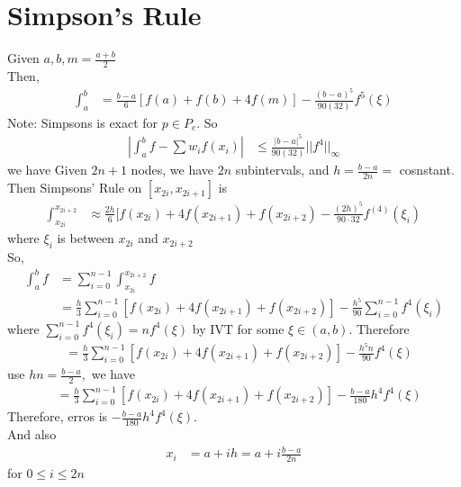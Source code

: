 \documentclass[11pt,oneside]{book}
\theoremstyle{break}
\theoremstyle{break}
\newcommand{\note}{\color{red}Note: \color{black}}
\begin{document}
\section[Simpson's Rule]{Simpson's Rule}
Given $a,b, m=\frac{a+b}{2}$\\
Then, \begin{align*}
\int_{a}^{b}&=\frac{b-a}{6}[f(a)+f(b)+4f(m)]-\frac{(b-a)^5}{90(32)}f^{5}(\xi)
\end{align*}
\note Simpsons is exact for $p\in P_e$. So \begin{align*}
\left|\int_{a}^{b}f-\sum w_if(x_i) \right|&\leq \frac{|b-a|^5}{90(32)}||f^{4}||_{\infty}
\end{align*}
we have Given $2n+1$ nodes, we have $2n$ subintervals, and $h=\frac{b-a}{2n}=$ cosnstant. Then Simpsons' Rule on $[x_{2i},x_{2i+1}]$ is \begin{align*}
\int_{x_{2i}}^{x_{2i+2}}&\approx \frac{2h}{6}[f(x_{2i})+4f(x_{2i+1})+f(x_{2i+2})-\frac{(2h)^5}{90\cdot 32}f^{(4)}(\xi_{i})
\end{align*}
where $\xi_{i}$ is between $x_{2i}$ and $x_{2i+2}$\\
So, \begin{align*}
\int_{a}^{b}f&=\sum_{i=0}^{n-1}\int_{x_{2i}}^{x_{2i+2}}f\\
&=\frac{h}{3}\sum_{i=0}^{n-1}[f(x_{2i})+4f(x_{2i+1})+f(x_{2i+2})]-\frac{h^5}{90}\sum_{i=0}^{n-1}f^{4}(\xi_i)
\end{align*}
where $\sum_{i=0}^{n-1}f^{4}(\xi_i)=nf^{4}(\xi)$ by IVT for some $\xi \in (a,b)$. Therefore \begin{align*}
&=\frac{h}{3}\sum_{i=0}^{n-1}[f(x_{2i})+4f(x_{2i+1})+f(x_{2i+2})]-\frac{h^5n}{90}f^{4}(\xi)
\end{align*}
use $hn=\frac{b-a}{2},$ we have \begin{align*}
&=\frac{h}{3}\sum_{i=0}^{n-1}[f(x_{2i})+4f(x_{2i+1})+f(x_{2i+2})]-\frac{b-a}{180}h^4f^{4}(\xi)
\end{align*}
Therefore, erros is $-\frac{b-a}{180}h^4f^{4}(\xi)$.\\
And also \begin{align*}
x_i&=a+ih=a+i\frac{b-a}{2n}
\end{align*}
for $0\leq i\leq 2n$
\end{document}
